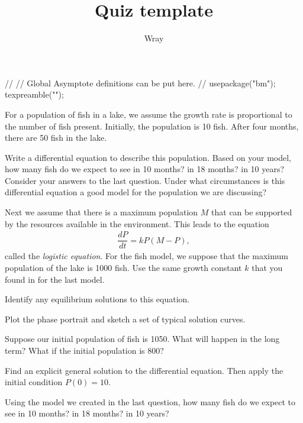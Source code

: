 \documentclass[addpoints, 12pt]{exam}
\title{Quiz template}
\author{Wray}
\begin{document}
\begin{asydef}
//
// Global Asymptote definitions can be put here.
//
usepackage("bm");
texpreamble("\def\V#1{\bm{#1}}");
\end{asydef}



\bigskip

             
\bigskip
\bigskip

\smallskip
For a population of fish in a lake, we assume the growth rate is proportional to the number of fish present.  Initially, the population is 10 fish.  After four months, there are 50 fish in the lake. 

\begin{questions}
\question
Write a differential equation to describe this population.
\question
Based on your model, how many fish do we expect to see in 10 months? in 18 months? in 10 years?
\question
Consider your answers to the last question.  Under what circumstances is this differential equation a good model for the population we are discussing?  

\end{questions}

\clearpage

Next we assume that there is a maximum population $M$ that can be supported by the resources available in the environment.  This leads to the equation
\begin{align*}
\dfrac{dP}{dt} = kP(M-P),
\end{align*}
called the \emph{logistic equation}.  For the fish model, we suppose that the maximum population of the lake is 1000 fish.  Use the same growth constant $k$ that you found in for the last model.

\begin{questions}

\setcounter{question}{3}
\question
Identify any equilibrium solutions to this equation.

\question
Plot the phase portrait and sketch a set of typical solution curves.  

\question
Suppose our initial population of fish is 1050.  What will happen in the long term?  What if the initial population is 800?

\question
Find an explicit general solution to the differential equation.  Then apply the initial condition $P(0) = 10$.

\question
Using the model we created in the last question, how many fish do we expect to see in 10 months? in 18 months? in 10 years?

\end{questions}
\end{document}
